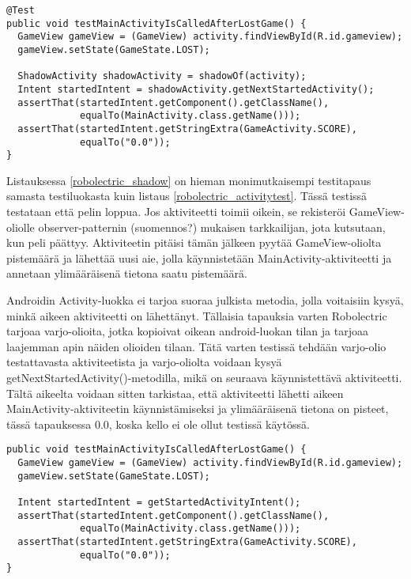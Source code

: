 \begin{lstlisting}[float,label=robolectric_shadow,caption=Robolectric Shadow objects]
@Test
public void testMainActivityIsCalledAfterLostGame() {
  GameView gameView = (GameView) activity.findViewById(R.id.gameview);
  gameView.setState(GameState.LOST);
  	
  ShadowActivity shadowActivity = shadowOf(activity);
  Intent startedIntent = shadowActivity.getNextStartedActivity();
  assertThat(startedIntent.getComponent().getClassName(), 
             equalTo(MainActivity.class.getName()));
  assertThat(startedIntent.getStringExtra(GameActivity.SCORE), 
             equalTo("0.0"));
}
\end{lstlisting}

Listauksessa \ref{robolectric_shadow} on hieman monimutkaisempi testitapaus samasta testiluokasta kuin listaus \ref{robolectric_activitytest}. Tässä testissä testataan että pelin loppua. Jos aktiviteetti toimii oikein, se rekisteröi GameView-oliolle observer-patternin (suomennos?) mukaisen tarkkailijan, jota kutsutaan, kun peli päättyy. Aktiviteetin pitäisi tämän jälkeen pyytää GameView-oliolta pistemäärä ja lähettää uusi aie, jolla käynnistetään MainActivity-aktiviteetti ja annetaan ylimääräisenä tietona saatu pistemäärä.

Androidin Activity-luokka ei tarjoa suoraa julkista metodia, jolla voitaisiin kysyä, minkä aikeen aktiviteetti on lähettänyt. Tällaisia tapauksia varten Robolectric tarjoaa varjo-olioita, jotka kopioivat oikean android-luokan tilan ja tarjoaa laajemman apin näiden olioiden tilaan. Tätä varten testissä tehdään varjo-olio testattavasta aktiviteetista ja varjo-oliolta voidaan kysyä getNextStartedActivity()-metodilla, mikä on seuraava käynnistettävä aktiviteetti. Tältä aikeelta voidaan sitten tarkistaa, että aktiviteetti lähetti aikeen MainActivity-aktiviteetin käynnistämiseksi ja ylimääräisenä tietona on pisteet, tässä tapauksessa 0.0, koska kello ei ole ollut testissä käytössä.

\begin{lstlisting}[float,label=android_intent,caption=ActivityUnitTestCase intents]
public void testMainActivityIsCalledAfterLostGame() {
  GameView gameView = (GameView) activity.findViewById(R.id.gameview);
  gameView.setState(GameState.LOST);
  	
  Intent startedIntent = getStartedActivityIntent();
  assertThat(startedIntent.getComponent().getClassName(), 
             equalTo(MainActivity.class.getName()));
  assertThat(startedIntent.getStringExtra(GameActivity.SCORE), 
             equalTo("0.0"));
}
\end{lstlisting}

